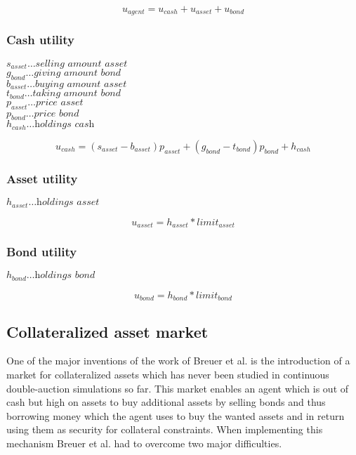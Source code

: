 \documentclass[../Bachelorarbeit.tex]{subfiles}
\begin{document}
\begin{equation}
u_{agent} = u_{cash} + u_{asset} + u_{bond}
\end{equation}

\subsubsection{Cash utility}
$s_{asset} \dots \textit{selling amount asset}$ \\
$g_{bond} \dots \textit{giving amount bond}$ \\
$b_{asset} \dots \textit{buying amount asset}$ \\
$t_{bond} \dots \textit{taking amount bond}$ \\
$p_{asset} \dots \textit{price asset}$ \\
$p_{bond} \dots \textit{price bond}$ \\
$h_{cash} \dots \textit{holdings cash}$

\begin{equation}
u_{cash} = (s_{asset} - b_{asset} ) p_{asset} + (g_{bond} - t_{bond}) p_{bond} + h_{cash}
\end{equation}

\subsubsection{Asset utility}
$h_{asset} \dots \textit{holdings asset}$ 

\begin{equation}
u_{asset} = h_{asset} * limit_{asset}
\end{equation}

\subsubsection{Bond utility}
$h_{bond} \dots \textit{holdings bond}$ 

\begin{equation}
u_{bond} = h_{bond} * limit_{bond}
\end{equation}

\subsection{Collateralized asset market}
One of the major inventions of the work of Breuer et al. is the introduction of a market for collateralized assets which has never been studied in continuous double-auction simulations so far. This market enables an agent which is out of cash but high on assets to buy additional assets by selling bonds and thus borrowing money which the agent uses to buy the wanted assets and in return using them as security for collateral constraints. When implementing this mechanism Breuer et al. had to overcome two major difficulties.
\end{document}
